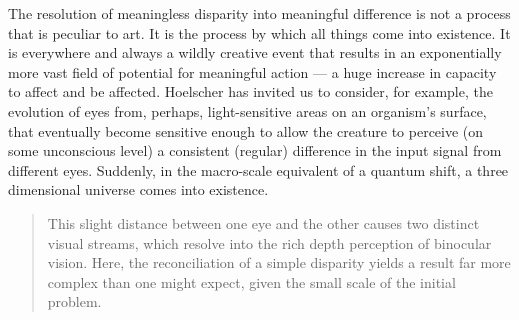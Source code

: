 \documentclass[letterpaper]{article}
\begin{document}

    

    The resolution of meaningless disparity into meaningful difference is not a process that is peculiar to art. It is the process by which all things come into existence. It is everywhere and always a wildly creative event that results in an exponentially more vast field of potential for meaningful action — a huge increase in capacity to affect and be affected. Hoelscher has invited us to consider, for example, the evolution of eyes from, perhaps, light-sensitive areas on an organism's surface, that eventually become sensitive enough to allow the creature to perceive (on some unconscious level) a consistent (regular) difference in the input signal from different eyes. Suddenly, in the macro-scale equivalent of a quantum shift, a three dimensional universe comes into existence.

    \begin{quote}
        This slight distance between one eye and the other causes two distinct visual streams, which resolve into the rich depth perception of binocular vision. Here, the reconciliation of a simple disparity yields a result far more complex than one might expect, given the small scale of the initial problem. \citep[p.5]{HoelscherArtAsInfrmtn2021}
    \end{quote}
\end{document}
